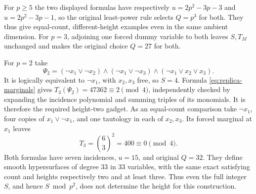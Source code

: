 For $p\geq5$ the two displayed formulas have respectively
$u=2p^2-3p-3$ and $u=2p^2-3p-1$, so the original least-power rule
selects $Q=p^3$ for both.  They thus give equal-count, different-height
examples even in the same ambient dimension.  For $p=3$, adjoining
one forced dummy variable to both leaves $S,T_M$ unchanged and makes
the original choice $Q=27$ for both.

For $p=2$ take
\[
 \Psi_2=(\neg x_1\vee\neg x_2)\wedge
        (\neg x_1\vee\neg x_3)\wedge
        (\neg x_1\vee x_2\vee x_3).
\]
It is logically equivalent to $\neg x_1$, with $x_2,x_3$ free, so
$S=4$.  Formula \eqref{eq:replica-marginals} gives
$T_3(\Psi_2)=47362\equiv2\pmod4$, independently checked by expanding
the incidence polynomial and summing triples of its monomials.
It is therefore the required height-two gadget.  As an equal-count
comparison take $\neg x_1$, four copies of $x_1\vee\neg x_1$, and
one tautology in each of $x_2,x_3$.  Its forced marginal at $x_1$
leaves
\[
 T_3=\binom63^2=400\equiv0\pmod4.
\]
Both formulas have seven incidences, $u=15$, and original $Q=32$.
They define smooth hypersurfaces of degree $33$ in $33$ variables,
with the same exact satisfying count and heights respectively two
and at least three.  Thus even the full integer $S$, and hence
$S\bmod p^2$, does not determine the height for this construction.

